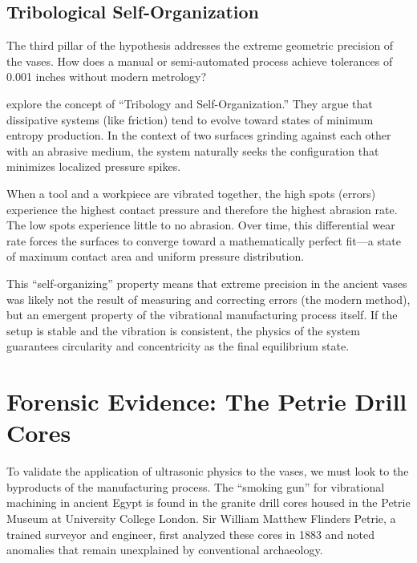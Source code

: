 \documentclass[11pt]{article}
\begin{document}
\subsection{Tribological Self-Organization}

The third pillar of the hypothesis addresses the extreme geometric precision of the vases. How does a manual or semi-automated process achieve tolerances of 0.001 inches without modern metrology?

\citet{Assenova2022} explore the concept of ``Tribology and Self-Organization.'' They argue that dissipative systems (like friction) tend to evolve toward states of minimum entropy production. In the context of two surfaces grinding against each other with an abrasive medium, the system naturally seeks the configuration that minimizes localized pressure spikes.

When a tool and a workpiece are vibrated together, the high spots (errors) experience the highest contact pressure and therefore the highest abrasion rate. The low spots experience little to no abrasion. Over time, this differential wear rate forces the surfaces to converge toward a mathematically perfect fit---a state of maximum contact area and uniform pressure distribution.

This ``self-organizing'' property means that extreme precision in the ancient vases was likely not the result of measuring and correcting errors (the modern method), but an emergent property of the vibrational manufacturing process itself. If the setup is stable and the vibration is consistent, the physics of the system guarantees circularity and concentricity as the final equilibrium state.

\section{Forensic Evidence: The Petrie Drill Cores}

To validate the application of ultrasonic physics to the vases, we must look to the byproducts of the manufacturing process. The ``smoking gun'' for vibrational machining in ancient Egypt is found in the granite drill cores housed in the Petrie Museum at University College London. Sir William Matthew Flinders Petrie, a trained surveyor and engineer, first analyzed these cores in 1883 \citep{Petrie1883} and noted anomalies that remain unexplained by conventional archaeology.
\end{document}
